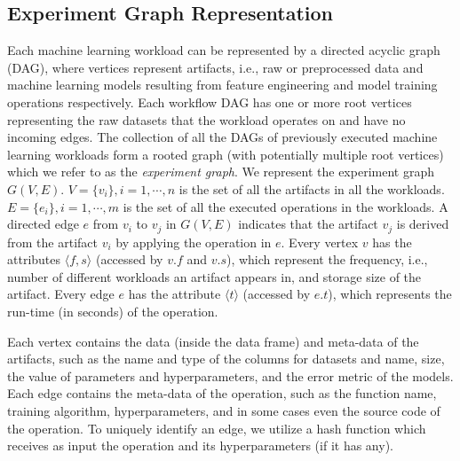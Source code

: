\subsection{Experiment Graph Representation}\label{sub-graph-construction}
Each machine learning workload can be represented by a directed acyclic graph (DAG), where vertices represent artifacts, i.e., raw or preprocessed data and machine learning models resulting from feature engineering and model training operations respectively.
Each workflow DAG has one or more root vertices representing the raw datasets that the workload operates on and have no incoming edges.
The collection of all the DAGs of previously executed machine learning workloads form a rooted graph (with potentially multiple root vertices) which we refer to as the \textit{experiment graph}.
We represent the experiment graph $G(V, E)$.
$V=\{v_i\}, i = 1, \cdots, n$ is the set of all the artifacts in all the workloads.
$E=\{e_i\}, i = 1, \cdots, m$ is the set of all the executed operations in the workloads.
A directed edge $e$ from $v_i$ to $v_j$ in $G(V, E)$ indicates that the artifact $v_j$ is derived from the artifact $v_i$ by applying the operation in $e$.
Every vertex $v$ has the attributes $\langle f, s \rangle$ (accessed by $v.f$ and $v.s$), which represent the  frequency, i.e., number of different workloads an artifact appears in, and storage size of the artifact.
Every edge $e$ has the attribute $\langle t \rangle$ (accessed by $e.t$), which represents the run-time (in seconds) of the operation.


Each vertex contains the data (inside the data frame) and meta-data of the artifacts, such as the name and type of the columns for datasets and name, size, the value of parameters and hyperparameters, and the error metric of the models.
Each edge contains the meta-data of the operation, such as the function name, training algorithm, hyperparameters, and in some cases even the source code of the operation.
To uniquely identify an edge, we utilize a hash function which receives as input the operation and its hyperparameters (if it has any).

